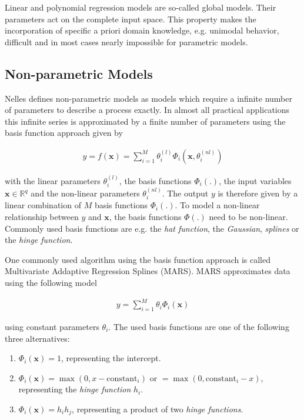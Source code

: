\documentclass[10pt,a4paper]{article}
\begin{document}
Linear and polynomial regression models are so-called global models. Their parameters act on the complete input space. This property makes the incorporation of specific a priori domain knowledge, e.g. unimodal behavior, difficult and in most cases nearly impossible for parametric models. 

\subsection{Non-parametric Models}

Nelles defines non-parametric models as models which require a infinite number of parameters to describe a process exactly. \cite{nelles2013nonlinear} In almost all practical applications this infinite series is approximated by a finite number of parameters using the basis function approach given by

\begin{align} \label{eq:basis-function-approach}
	y = f(\boldsymbol{x}) = \sum_{i=1}^M \theta_i^{(l)} \Phi_i(\boldsymbol{x}, \theta_i^{(nl)})
\end{align} 

with the linear parameters $\theta_i^{(l)}$, the basis functions $\Phi_i(.)$, the input variables $\boldsymbol{x} \in \mathbb R^{q}$ and the non-linear parameters $\theta_i^{(nl)}$. The output $y$ is therefore given by a linear combination of $M$ basis functions $\Phi_i(.)$. To model a non-linear relationship between $y$ and $\boldsymbol{x}$, the basis functions $\Phi(.)$ need to be non-linear. Commonly used basis functions are e.g. the \emph{hat function}, the \emph{Gaussian}, \emph{splines} or the \emph{hinge function}. 

One commonly used algorithm using the basis function approach is called Multivariate Addaptive Regression Splines (MARS). \cite{friedman1991multivariate} MARS approximates data using the following model

\begin{align} \label{eq:MARS}
	y = \sum_{i=1}^M \theta_i \Phi_i(\boldsymbol{x})
\end{align}

using constant parameters $\theta_i$. The used basis functions are one of the following three alternatives:
\begin{enumerate}
	\item $\Phi_i(\boldsymbol{x}) = 1$, representing the intercept.
	\item $\Phi_i(\boldsymbol{x}) = \max(0, x - \text{constant}_i)$ or $= \max(0, \text{constant}_i - x)$, representing the \emph{hinge function} $h_i$.
	\item $\Phi_i(\boldsymbol{x}) = h_i  h_j$, representing a product of two \emph{hinge functions}.
\end{enumerate}
\end{document}
